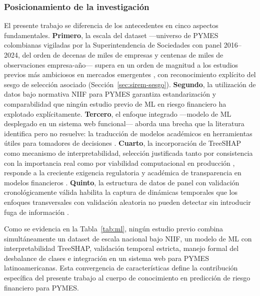\documentclass[12pt, letterpaper]{article}
\begin{document}
\subsubsection{Posicionamiento de la investigaci\'on}

El presente trabajo se diferencia de los antecedentes en cinco aspectos fundamentales. \textbf{Primero}, la escala del dataset ---universo de PYMES colombianas vigiladas por la Superintendencia de Sociedades con panel 2016--2024, del orden de decenas de miles de empresas y centenas de miles de observaciones empresa-a\~no--- supera en un orden de magnitud a los estudios previos m\'as ambiciosos en mercados emergentes \citep{Mahesh2025}, con reconocimiento expl\'icito del sesgo de selecci\'on asociado (Secci\'on~\ref{sec:sirem-sesgo}). \textbf{Segundo}, la utilizaci\'on de datos bajo normativa NIIF para PYMES garantiza estandarizaci\'on y comparabilidad que ning\'un estudio previo de ML en riesgo financiero ha explotado expl\'icitamente. \textbf{Tercero}, el enfoque integrado ---modelo de ML desplegado en un sistema web funcional--- aborda una brecha que la literatura identifica pero no resuelve: la traducci\'on de modelos acad\'emicos en herramientas \'utiles para tomadores de decisiones \citep{MayorgaLira2023, BaumontDeOliveira2021, Ioannou2022}. \textbf{Cuarto}, la incorporaci\'on de TreeSHAP como mecanismo de interpretabilidad, selecci\'on justificada tanto por consistencia con la importancia real \citep{Pathi2025} como por viabilidad computacional en producci\'on \citep{LundbergTreeSHAP2020, Deng2024}, responde a la creciente exigencia regulatoria y acad\'emica de transparencia en modelos financieros \citep{Bussmann2020, Bazarbash2019}. \textbf{Quinto}, la estructura de datos de panel con validaci\'on cronol\'ogicamente v\'alida habilita la captura de din\'amicas temporales que los enfoques transversales con validaci\'on aleatoria no pueden detectar sin introducir fuga de informaci\'on \citep{Zhou2022, Otsuki2022, Bortolotti2024}.

Como se evidencia en la Tabla~\ref{tab:ml}, ning\'un estudio previo combina simult\'aneamente un dataset de escala nacional bajo NIIF, un modelo de ML con interpretabilidad TreeSHAP, validaci\'on temporal estricta, manejo formal del desbalance de clases e integraci\'on en un sistema web para PYMES latinoamericanas. Esta convergencia de caracter\'isticas define la contribuci\'on espec\'ifica del presente trabajo al cuerpo de conocimiento en predicci\'on de riesgo financiero para PYMES.
\end{document}
